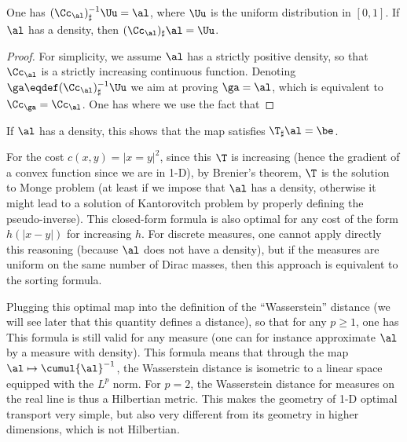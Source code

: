 \begin{prop}
	One has $(\Cc_\al)^{-1}_\sharp \Uu = \al$,  
	where $\Uu$ is the uniform distribution in $[0,1]$. 
	If $\al$ has a density, then $(\Cc_\al)_\sharp \al = \Uu$.
\end{prop}
\begin{proof}
	For simplicity, we assume $\al$ has a strictly positive density, so that $\Cc_\al$ is a strictly increasing continuous function.
	Denoting $\ga \eqdef (\Cc_\al)^{-1}_\sharp \Uu$ we aim at proving $\ga=\al$, which is equivalent to 
	$\Cc_\ga=\Cc_\al$. One has
	\eq{
		\Cc_\ga(x) = \int_{-\infty}^x \d \ga = \int_\RR 1_{]-\infty,x]} \d( (\Cc_\al^{-1})_\sharp \Uu)
		  	 = \int_0^1 1_{]-\infty,x]}(\Cc_\al^{-1}(z)) \d z
			 = \int_0^1 1_{[0,\Cc_\al(x)]}(z) \d z
			 = \Cc_\al(x)
	}
	where we use the fact that 
\end{proof}

%
If $\al$ has a density, this shows that the map
satisfies $\T_\sharp \al = \be$. 

For the cost $c(x,y)=|x=y|^2$, since this $\T$ is increasing (hence the gradient of a convex function since we are in 1-D), by Brenier's theorem, $\T$ is the solution to Monge problem (at least if we impose that $\al$ has a density, otherwise it might lead to a solution of Kantorovitch problem by properly defining the pseudo-inverse). 
%
This closed-form formula is also optimal for any cost of the form $h(|x-y|)$ for increasing $h$. 
%
For discrete measures, one cannot apply directly this reasoning (because $\al$ does not have a density), but if the measures are uniform on the same number of Dirac masses, then this approach is equivalent to the sorting formula. 

Plugging this optimal map into the definition of the ``Wasserstein'' distance (we will see later that this quantity defines a distance), so that for any $p \geq 1$, one has
This formula is still valid for any measure (one can for instance approximate $\al$ by a measure with density). 
%
This formula means that through the map $\al \mapsto \cumul{\al}^{-1}$, the Wasserstein distance is isometric to a linear space equipped with the $L^p$ norm. For $p=2$, the Wasserstein distance for measures on the real line is thus a Hilbertian metric. 
This makes the geometry of 1-D optimal transport very simple, but also very different from its geometry in higher dimensions, which is not Hilbertian.

